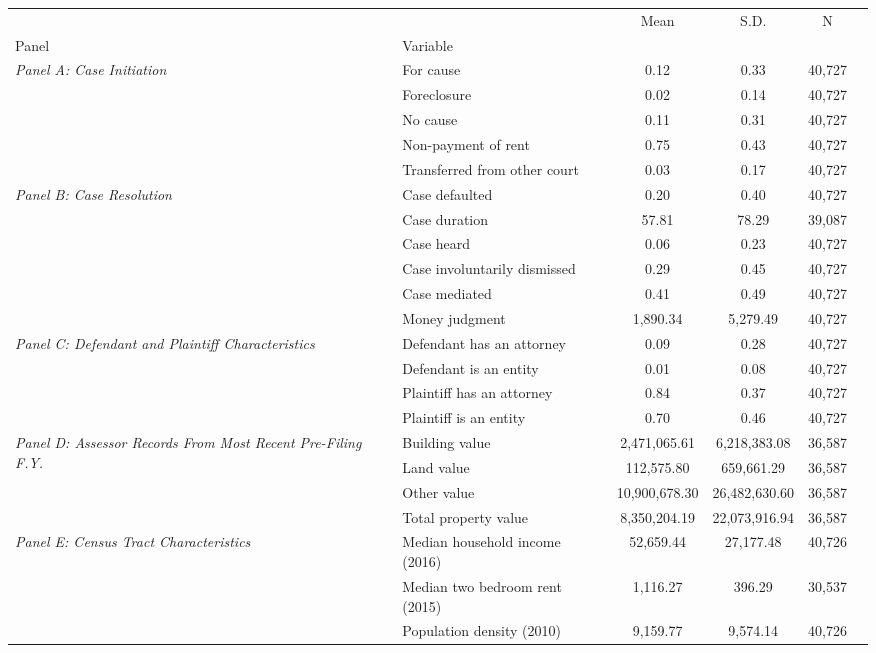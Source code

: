 \begin{tabular}{llcccc}
\toprule
 &  & Mean & S.D. & N \\
Panel & Variable &  &  &  \\
\midrule
\multirow[c]{5}{4cm}{\textit{Panel A: Case Initiation}} & For cause & 0.12 & 0.33 & 40,727 \\
 & Foreclosure & 0.02 & 0.14 & 40,727 \\
 & No cause & 0.11 & 0.31 & 40,727 \\
 & Non-payment of rent & 0.75 & 0.43 & 40,727 \\
 & Transferred from other court & 0.03 & 0.17 & 40,727 \\
\cline{1-5}
\multirow[c]{6}{4cm}{\textit{Panel B: Case Resolution}} & Case defaulted & 0.20 & 0.40 & 40,727 \\
 & Case duration & 57.81 & 78.29 & 39,087 \\
 & Case heard & 0.06 & 0.23 & 40,727 \\
 & Case involuntarily dismissed & 0.29 & 0.45 & 40,727 \\
 & Case mediated & 0.41 & 0.49 & 40,727 \\
 & Money judgment & 1,890.34 & 5,279.49 & 40,727 \\
\cline{1-5}
\multirow[c]{4}{4cm}{\textit{Panel C: Defendant and Plaintiff Characteristics}} & Defendant has an attorney & 0.09 & 0.28 & 40,727 \\
 & Defendant is an entity & 0.01 & 0.08 & 40,727 \\
 & Plaintiff has an attorney & 0.84 & 0.37 & 40,727 \\
 & Plaintiff is an entity & 0.70 & 0.46 & 40,727 \\
\cline{1-5}
\multirow[c]{4}{4cm}{\textit{Panel D: Assessor Records From Most Recent Pre-Filing F.Y.}} & Building value & 2,471,065.61 & 6,218,383.08 & 36,587 \\
 & Land value & 112,575.80 & 659,661.29 & 36,587 \\
 & Other value & 10,900,678.30 & 26,482,630.60 & 36,587 \\
 & Total property value & 8,350,204.19 & 22,073,916.94 & 36,587 \\
\cline{1-5}
\multirow[c]{4}{4cm}{\textit{Panel E: Census Tract Characteristics}} & Median household income (2016) & 52,659.44 & 27,177.48 & 40,726 \\
 & Median two bedroom rent (2015) & 1,116.27 & 396.29 & 30,537 \\
 & Population density (2010) & 9,159.77 & 9,574.14 & 40,726 \\

\end{tabular}
